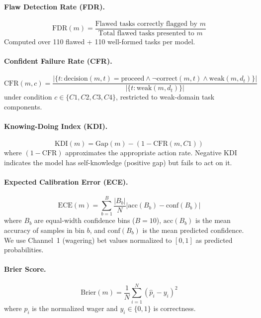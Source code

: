 \documentclass[10pt]{article}
\newcommand{\KDI}{KDI}
\newcommand{\CFR}{CFR}
\newcommand{\FDR}{FDR}
\begin{document}
\paragraph{Flaw Detection Rate (\FDR{}).}
\begin{equation}
\text{FDR}(m) = \frac{\text{Flawed tasks correctly flagged by } m}{\text{Total flawed tasks presented to } m}
\end{equation}
Computed over 110 flawed + 110 well-formed tasks per model.

\paragraph{Confident Failure Rate (\CFR{}).}
\begin{equation}
\text{CFR}(m, c) = \frac{|\{t : \text{decision}(m,t) = \text{proceed} \wedge \neg\text{correct}(m,t) \wedge \text{weak}(m,d_t)\}|}{|\{t : \text{weak}(m, d_t)\}|}
\label{eq:cfr}
\end{equation}
under condition $c \in \{C1, C2, C3, C4\}$, restricted to weak-domain task components.

\paragraph{Knowing-Doing Index (\KDI{}).}
\begin{equation}
\text{KDI}(m) = \text{Gap}(m) - (1 - \text{CFR}(m, C1))
\label{eq:kdi}
\end{equation}
where $(1 - \text{CFR})$ approximates the appropriate action rate. Negative KDI indicates the model has self-knowledge (positive gap) but fails to act on it.

\paragraph{Expected Calibration Error (ECE).}
\begin{equation}
\text{ECE}(m) = \sum_{b=1}^{B} \frac{|B_b|}{N} \left| \text{acc}(B_b) - \text{conf}(B_b) \right|
\end{equation}
where $B_b$ are equal-width confidence bins ($B\!=\!10$), $\text{acc}(B_b)$ is the mean accuracy of samples in bin $b$, and $\text{conf}(B_b)$ is the mean predicted confidence. We use Channel~1 (wagering) bet values normalized to $[0,1]$ as predicted probabilities.

\paragraph{Brier Score.}
\begin{equation}
\text{Brier}(m) = \frac{1}{N} \sum_{i=1}^{N} (\hat{p}_i - y_i)^2
\end{equation}
where $\hat{p}_i$ is the normalized wager and $y_i \in \{0,1\}$ is correctness.
\end{document}
